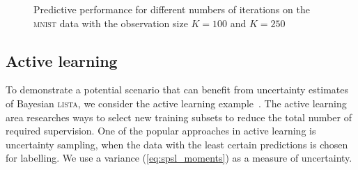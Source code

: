 \documentclass{article}
\begin{document}
  \begin{figure}[t!]
  \centering
  \caption{Predictive performance for different numbers of iterations on the \textsc{mnist} data with the observation size $K = 100$ and $K = 250$}
  \label{fig:mnist}
  \end{figure}
  
  \subsection{Active learning}
  To demonstrate a potential scenario that can benefit from uncertainty estimates of Bayesian \textsc{lista}, we consider the active learning example~\cite{settles.tr09}. The active learning area researches ways to select new training subsets to reduce the total number of required supervision. One of the popular approaches in active learning is uncertainty sampling, when the data with the least certain predictions is chosen for labelling. We use a variance (\ref{eq:spsl_moments}) as a measure of uncertainty.
  
\end{document}
